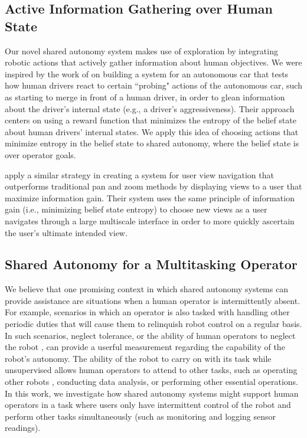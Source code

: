 \documentclass[conference]{IEEEtran}
\begin{document}
\subsection{Active Information Gathering over Human State}
Our novel shared autonomy system makes use of exploration by integrating robotic actions that actively gather information about human objectives. We were inspired by the work of \citet{sadigh2016information} on building a system for an autonomous car that tests how human drivers react to certain ``probing" actions of the autonomous car, such as starting to merge in front of a human driver, in order to glean information about the driver's internal state (e.g., a driver's aggressiveness). Their approach centers on using a reward function that minimizes the entropy of the belief state about human drivers' internal states. We apply this idea of choosing actions that minimize entropy in the belief state to shared autonomy, where the belief state is over operator goals.

\citet{liu2017bignav} apply a similar strategy in creating a system for user view navigation that outperforms traditional pan and zoom methods by displaying views to a user that maximize information gain. Their system uses the same principle of information gain (i.e., minimizing belief state entropy) to choose new views as a user navigates through a large multiscale interface in order to more quickly ascertain the user's ultimate intended view.

\subsection{Shared Autonomy for a Multitasking Operator}
We believe that one promising context in which shared autonomy systems can provide assistance are situations when a human operator is intermittently absent. For example, scenarios in which an operator is also tasked with handling other periodic duties that will cause them to relinquish robot control on a regular basis. In such scenarios, neglect tolerance, or the ability of human operators to neglect the robot \cite{crandall2002characterizing, olsen2003metrics}, can provide a userful measurement regarding the capability of the robot's autonomy. The ability of the robot to carry on with its task while unsupervised allows human operators to attend to other tasks, such as operating other robots \cite{crandall2005validating, cummings2008predicting}, conducting data analysis, or performing other essential operations. In this work, we investigate how shared autonomy systems might support human operators in a task where users only have intermittent control of the robot and perform other tasks simultaneously (such as monitoring and logging sensor readings). 
\end{document}
